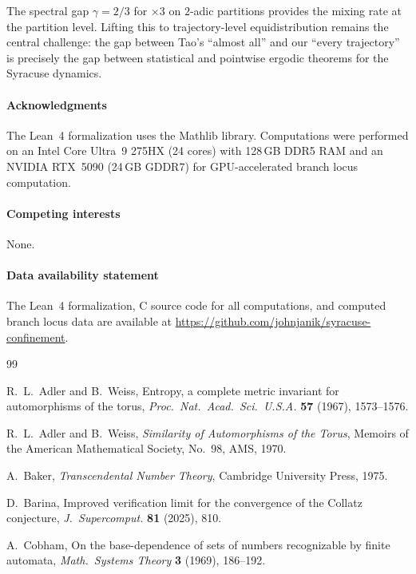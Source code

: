 \documentclass{CUP-JNL-FMP}%
\theoremstyle{definition}
\numberwithin{equation}{section}
\begin{document}
The spectral gap $\gamma = 2/3$ for $\times 3$ on $2$-adic partitions
provides the mixing rate at the partition level.
Lifting this to trajectory-level equidistribution remains the central challenge:
the gap between Tao's ``almost all'' and our ``every trajectory'' is precisely
the gap between statistical and pointwise ergodic theorems for the Syracuse
dynamics.


\begin{Backmatter}

\paragraph{Acknowledgments}
The Lean~4 formalization uses the Mathlib library. Computations were performed
on an Intel Core Ultra~9 275HX (24 cores) with 128\,GB DDR5 RAM and an
NVIDIA RTX~5090 (24\,GB GDDR7) for GPU-accelerated branch locus computation.

\paragraph{Competing interests}
None.

\paragraph{Data availability statement}
The Lean~4 formalization, C source code for all computations, and computed
branch locus data are available at
\url{https://github.com/johnjanik/syracuse-confinement}.

\begin{thebibliography}{99}

R.~L.~Adler and B.~Weiss, Entropy, a complete metric invariant for
automorphisms of the torus, \emph{Proc.\ Nat.\ Acad.\ Sci.\ U.S.A.}
\textbf{57} (1967), 1573--1576.

R.~L.~Adler and B.~Weiss, \emph{Similarity of Automorphisms of the Torus},
Memoirs of the American Mathematical Society, No.~98, AMS, 1970.

A.~Baker, \emph{Transcendental Number Theory}, Cambridge University Press, 1975.

D.~Barina, Improved verification limit for the convergence of the Collatz
conjecture, \emph{J.\ Supercomput.} \textbf{81} (2025), 810.

A.~Cobham, On the base-dependence of sets of numbers recognizable by finite
automata, \emph{Math.\ Systems Theory} \textbf{3} (1969), 186--192.


\end{thebibliography}
\end{Backmatter}
\end{document}
